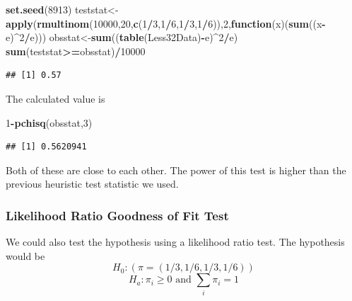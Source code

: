 \documentclass[]{book}
\newenvironment{Shaded}{\begin{snugshade}}{\end{snugshade}}
\newcommand{\KeywordTok}[1]{\textcolor[rgb]{0.13,0.29,0.53}{\textbf{#1}}}
\newcommand{\DecValTok}[1]{\textcolor[rgb]{0.00,0.00,0.81}{#1}}
\newcommand{\ControlFlowTok}[1]{\textcolor[rgb]{0.13,0.29,0.53}{\textbf{#1}}}
\newcommand{\OperatorTok}[1]{\textcolor[rgb]{0.81,0.36,0.00}{\textbf{#1}}}
\newcommand{\NormalTok}[1]{#1}
\theoremstyle{definition}
\theoremstyle{definition}
\theoremstyle{definition}
\theoremstyle{remark}
\begin{document}
\begin{Shaded}
\begin{Highlighting}[]
\KeywordTok{set.seed}\NormalTok{(}\DecValTok{8913}\NormalTok{)}
\NormalTok{teststat<-}\KeywordTok{apply}\NormalTok{(}\KeywordTok{rmultinom}\NormalTok{(}\DecValTok{10000}\NormalTok{,}\DecValTok{20}\NormalTok{,}\KeywordTok{c}\NormalTok{(}\DecValTok{1}\OperatorTok{/}\DecValTok{3}\NormalTok{,}\DecValTok{1}\OperatorTok{/}\DecValTok{6}\NormalTok{,}\DecValTok{1}\OperatorTok{/}\DecValTok{3}\NormalTok{,}\DecValTok{1}\OperatorTok{/}\DecValTok{6}\NormalTok{)),}\DecValTok{2}\NormalTok{,}\ControlFlowTok{function}\NormalTok{(x)(}\KeywordTok{sum}\NormalTok{((x}\OperatorTok{-}\NormalTok{e)}\OperatorTok{^}\DecValTok{2}\OperatorTok{/}\NormalTok{e)))}
\NormalTok{obsstat<-}\KeywordTok{sum}\NormalTok{((}\KeywordTok{table}\NormalTok{(Less32Data)}\OperatorTok{-}\NormalTok{e)}\OperatorTok{^}\DecValTok{2}\OperatorTok{/}\NormalTok{e)}
\KeywordTok{sum}\NormalTok{(teststat}\OperatorTok{>=}\NormalTok{obsstat)}\OperatorTok{/}\DecValTok{10000}
\end{Highlighting}
\end{Shaded}

\begin{verbatim}
## [1] 0.57
\end{verbatim}

The calculated value is

\begin{Shaded}
\begin{Highlighting}[]
\DecValTok{1}\OperatorTok{-}\KeywordTok{pchisq}\NormalTok{(obsstat,}\DecValTok{3}\NormalTok{)}
\end{Highlighting}
\end{Shaded}

\begin{verbatim}
## [1] 0.5620941
\end{verbatim}

Both of these are close to each other. The power of this test is higher
than the previous heuristic test statistic we used.

\subsubsection{Likelihood Ratio Goodness of Fit
Test}\label{likelihood-ratio-goodness-of-fit-test}

We could also test the hypothesis using a likelihood ratio test. The
hypothesis would be \[H_{0}: (\pi = (1/3,1/6,1/3,1/6))\]
\[H_{a}: \pi_{i} \geq 0 \mbox{ and } \sum_{i} \pi_{i}=1\]
\end{document}
